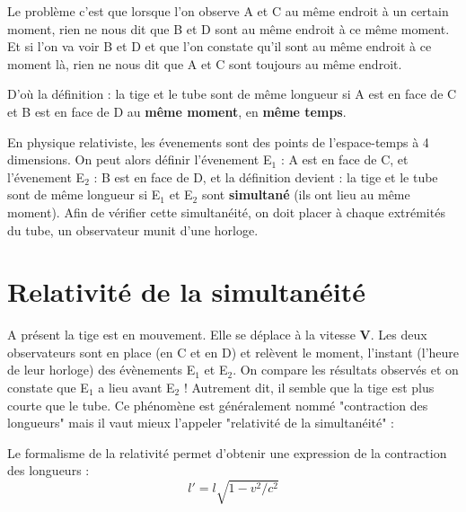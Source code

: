 
Le problème c'est que lorsque l'on observe A et C au même endroit à un certain moment, rien ne nous dit que B et D sont au même endroit à ce même moment. Et si l'on va voir B et D et que l'on constate qu'il sont au même endroit à ce moment là, rien ne nous dit que A et C sont toujours au même endroit.

D'où la définition : la tige et le tube sont de même longueur si A est en face de C et B est en face de D au {\bf même moment}, en {\bf même temps}.

En physique relativiste, les évenements sont des points de l'espace-temps à 4 dimensions.
On peut alors définir l'évenement E$_1$ : A est en face de C, et l'évenement E$_2$ : B est en face de D, et la définition devient : la tige et le tube sont de même longueur si E$_1$ et E$_2$ sont {\bf simultané} (ils ont lieu au même moment). Afin de vérifier cette simultanéité, on doit placer à chaque extrémités du tube, un observateur munit d'une horloge.

\section{Relativité de la simultanéité}

A présent la tige est en mouvement. Elle se déplace à la vitesse {\bf V}. Les deux observateurs sont en place (en C et en D) et relèvent le moment, l'instant (l'heure de leur horloge) des évènements E$_1$ et E$_2$. On compare les résultats observés et on constate que E$_1$ a lieu avant E$_2$ ! Autrement dit, il semble que la tige est plus courte que le tube. Ce phénomène est généralement nommé "contraction des longueurs" mais il vaut mieux l'appeler "relativité de la simultanéité" : 
\begin{center}
\end{center}

Le formalisme de la relativité permet d'obtenir une expression de la contraction des longueurs : 
\[
l'=l\sqrt{1-v^2/c^2}
\]

